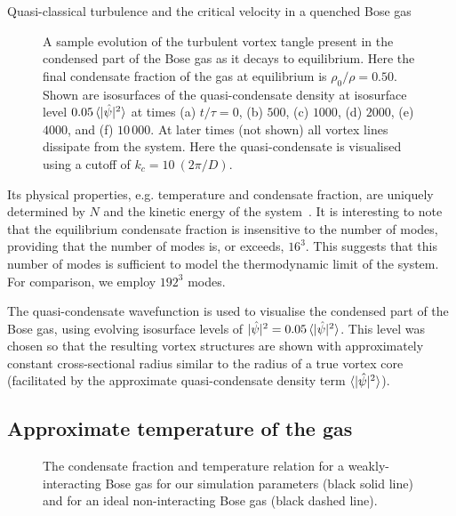 \begin{chapter}{\label{cha:nonequib}Quasi-classical turbulence and the critical velocity in a quenched Bose gas}
\begin{figure}
    \caption{A sample evolution of the turbulent vortex tangle present in the condensed part of the Bose gas as it decays to equilibrium. Here the final condensate fraction of the gas at equilibrium is $\rho_0/\rho = 0.50$. Shown are isosurfaces of the quasi-condensate density at isosurface level $0.05\braket{|\hat{\psi}|^2}$ at times (a) $t/\tau=0$, (b) $500$, (c) $1000$, (d) $2000$, (e) $4000$, and (f) $10\,000$. At later times (not shown) all vortex lines dissipate from the system. Here the quasi-condensate is visualised using a cutoff of $k_{c} = 10~(2\pi/D)$.
}
    \label{fig:thermal}
\end{figure}

Its physical properties, e.g. temperature and condensate fraction, are uniquely determined by $N$ and the kinetic energy of the system~\cite{PhysRevLett.95.263901}. It is interesting to note that the equilibrium condensate fraction is insensitive to the number of modes, providing that the number of modes is, or exceeds, $16^3$.  This suggests that this number of modes is sufficient to model the thermodynamic limit of the system. For comparison, we employ $192^3$ modes.

The quasi-condensate wavefunction is used to visualise the condensed part of the Bose gas, using evolving isosurface levels of $|\hat{\psi}|^2 = 0.05\braket{|\hat{\psi}|^2}$. This level was chosen so that the resulting vortex structures are shown with approximately constant cross-sectional radius similar to the radius of a true vortex core (facilitated by the approximate quasi-condensate density term $\braket{|\hat{\psi}|^2}$).

\subsection{Approximate temperature of the gas}
\begin{figure}
\begin{center}
%
\end{center}
\caption{\label{fig:cfvst}The condensate fraction and temperature relation for a weakly-interacting Bose gas for our simulation parameters (black solid line) and for an ideal non-interacting Bose gas (black dashed line).}
\end{figure} 


\end{chapter}
